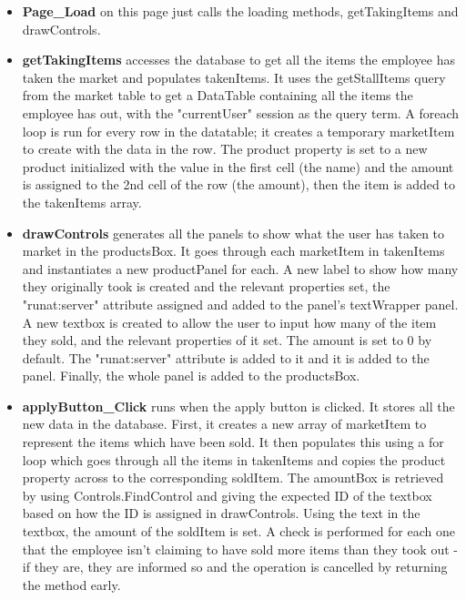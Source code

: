 ﻿\documentclass{article}
\begin{document}
    \begin{itemize}
        \item \textbf{Page\_Load} on this page just calls the loading methods, getTakingItems and drawControls.
        \item \textbf{getTakingItems} accesses the database to get all the items the employee has taken the market and populates takenItems.
        It uses the getStallItems query from the market table to get a DataTable containing all the items the employee has out, with the "currentUser" session as the query term.
        A foreach loop is run for every row in the datatable; it creates a temporary marketItem to create with the data in the row.
        The product property is set to a new product initialized with the value in the first cell (the name) and the amount is assigned to the 2nd cell of the row (the amount), then the item is added to the takenItems array.
        \item \textbf{drawControls} generates all the panels to show what the user has taken to market in the productsBox.
        It goes through each marketItem in takenItems and instantiates a new productPanel for each.
        A new label to show how many they originally took is created and the relevant properties set, the "runat:server" attribute assigned and added to the panel's textWrapper panel.
        A new textbox is created to allow the user to input how many of the item they sold, and the relevant properties of it set.
        The amount is set to 0 by default.
        The "runat:server" attribute is added to it and it is added to the panel.
        Finally, the whole panel is added to the productsBox.
        \item \textbf{applyButton\_Click} runs when the apply button is clicked.
        It stores all the new data in the database.
        First, it creates a new array of marketItem to represent the items which have been sold.
        It then populates this using a for loop which goes through all the items in takenItems and copies the product property across to the corresponding soldItem.
        The amountBox is retrieved by using Controls.FindControl and giving the expected ID of the textbox based on how the ID is assigned in drawControls.
        Using the text in the textbox, the amount of the soldItem is set.
        A check is performed for each one that the employee isn't claiming to have sold more items than they took out - if they are, they are informed so and the operation is cancelled by returning the method early.
        \\

\end{itemize}
\end{document}
